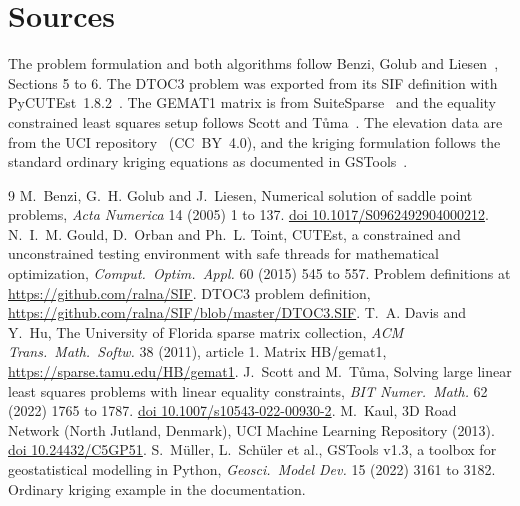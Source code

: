 \documentclass[10pt]{article}
\begin{document}
\section*{Sources}

The problem formulation and both algorithms follow Benzi, Golub and Liesen~\cite{benzi2005},
Sections 5 to 6. The DTOC3 problem was exported from its SIF definition with
PyCUTEst~1.8.2~\cite{cutest}. The GEMAT1 matrix is from SuiteSparse~\cite{suitesparse} and
the equality constrained least squares setup follows Scott and T\r{u}ma~\cite{scotttuma2022}.
The elevation data are from the UCI repository~\cite{uci_road} (CC~BY~4.0), and the kriging
formulation follows the standard ordinary kriging equations as documented in
GSTools~\cite{gstools}.

\begin{thebibliography}{9}
 M.~Benzi, G.~H. Golub and J.~Liesen, Numerical solution of saddle
point problems, \emph{Acta Numerica} 14 (2005) 1 to 137. \href{https://doi.org/10.1017/S0962492904000212}{doi 10.1017/S0962492904000212}.
 N.~I.~M. Gould, D.~Orban and Ph.~L. Toint, CUTEst, a constrained and
unconstrained testing environment with safe threads for mathematical optimization,
\emph{Comput.\ Optim.\ Appl.} 60 (2015) 545 to 557. Problem definitions at
\url{https://github.com/ralna/SIF}.
 DTOC3 problem definition, \url{https://github.com/ralna/SIF/blob/master/DTOC3.SIF}.
 T.~A. Davis and Y.~Hu, The University of Florida sparse matrix
collection, \emph{ACM Trans.\ Math.\ Softw.} 38 (2011), article 1. Matrix HB/gemat1,
\url{https://sparse.tamu.edu/HB/gemat1}.
 J.~Scott and M.~T\r{u}ma, Solving large linear least squares
problems with linear equality constraints, \emph{BIT Numer.\ Math.} 62 (2022) 1765 to 1787.
\href{https://doi.org/10.1007/s10543-022-00930-2}{doi 10.1007/s10543-022-00930-2}.
 M.~Kaul, 3D Road Network (North Jutland, Denmark), UCI Machine Learning
Repository (2013). \href{https://doi.org/10.24432/C5GP51}{doi 10.24432/C5GP51}.
 S.~M\"uller, L.~Sch\"uler et al., GSTools v1.3, a toolbox for geostatistical
modelling in Python, \emph{Geosci.\ Model Dev.} 15 (2022) 3161 to 3182. Ordinary kriging
example in the documentation.
\end{thebibliography}
\end{document}
